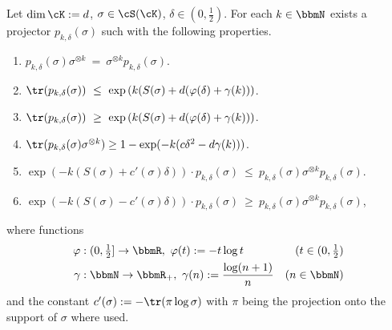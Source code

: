 \begin{theorem}
 Let $\dim \cK := d$, $\sigma \in \cS(\cK)$, $\delta \in (0, \frac{1}{2})$. For each $k \in \bbmN$ exists a projector 
 $p_{k,\delta}(\sigma)$ such with the following properties. 
 \begin{enumerate}
  \item $p_{k,\delta}(\sigma) \sigma^{\otimes k} \ = \  \sigma^{\otimes k} p_{k,\delta}(\sigma)$.
  \item $\tr(p_{k,\delta}(\sigma)) \ \leq \ \exp\left(k(S(\sigma) + d (\varphi(\delta) + \gamma(k)) \right)$.
  \item $\tr(p_{k,\delta}(\sigma)) \ \geq \ \exp\left(k(S(\sigma) + d (\varphi(\delta) + \gamma(k)) \right)$.
  \item $\tr(p_{k,\delta}(\sigma) \sigma ^{\otimes k}) \geq 1 - \exp(-k(c \delta^2 - d \gamma(k)) )$.
  \item $\exp\left( - k(S(\sigma) + c'(\sigma)\delta)\right) \cdot p_{k,\delta}(\sigma) 
  \ \leq \ p_{k,\delta}(\sigma) \sigma^{\otimes k} p_{k,\delta}(\sigma)$.
  \item $\exp\left( - k(S(\sigma) - c'(\sigma)\delta)\right) \cdot p_{k,\delta}(\sigma) 
  \ \geq \ p_{k,\delta}(\sigma) \sigma^{\otimes k} p_{k,\delta}(\sigma)$,
 \end{enumerate}
  where functions
  \begin{align}
   \varphi&: (0, \tfrac{1}{2}] \rightarrow \bbmR, \ \varphi(t) := -t \log t &(t \in (0, \tfrac{1}{2}) \\
   \gamma &: \bbmN \rightarrow \bbmR_+, \ \gamma(n):= \frac{\log(n+1)}{n} &(n \in \bbmN)
  \end{align}
 and the constant $c'(\sigma) := - \tr(\pi \log \sigma)$ with $\pi$ being the projection onto the support of $\sigma$ where
 used. 
\end{theorem}

